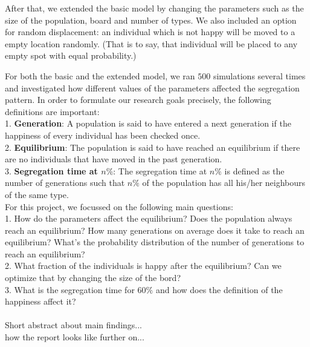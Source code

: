After that, we extended the basic model by changing the parameters such as the size of the population, board and number of types. 
We also included an option for random displacement: an individual which is not happy will be moved to a empty location randomly. 
(That is to say, that individual will be placed to any empty spot with equal probability.)

For both the basic and the extended model, we ran $500$ simulations several times and investigated how different values of the parameters affected the segregation pattern. 
In order to formulate our research goals precisely, the following definitions are important:\\
1. \textbf{Generation}: 
A population is said to have entered a next generation if the happiness of every individual has been checked once. \\
2. \textbf{Equilibrium}: 
The population is said to have reached an equilibrium if there are no individuals that have moved in the past generation.\\
3. \textbf{Segregation time at $n\%$}: 
The segregation time at $n\%$ is defined as the number of generations such that $n\%$ of the population has all his/her neighbours of the same type.\\

For this project, we focussed on the following main questions:\\
1. How do the parameters affect the equilibrium? 
Does the population always reach an equilibrium? 
How many generations on average does it take to reach an equilibrium? 
What's the probability distribution of the number of generations to reach an equilibrium?\\
2. What fraction of the individuals is happy after the equilibrium? 
Can we optimize that by changing the size of the bord?\\
3. What is the segregation time for 60$\%$ and how does the definition of the happiness affect it?\\
\\
Short abstract about main findings...\\
how the report looks like further on...
